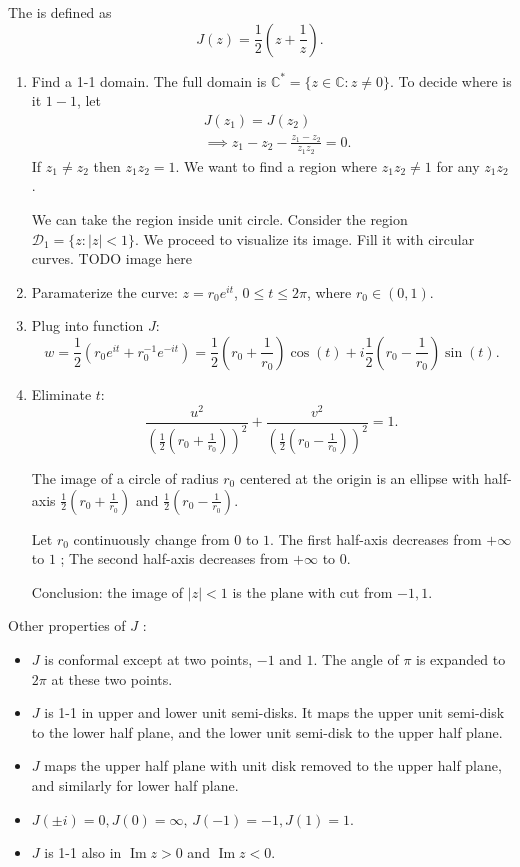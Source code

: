 \begin{example}
	The  is defined as
	\[
	J(z) = \frac{1}{2}(z + \frac{1}{z})
	.\]
	\begin{enumerate}
		\item Find a 1-1 domain. The full domain is $\mathbb{C}^* = \{z \in \mathbb{C}: z \neq  0\} $.
	To decide where is it $1-1$, let
	\begin{align*}
		& J(z_1) = J(z_2)\\
		&\implies z_1-z_2 - \frac{z_1-z_2}{z_1z_2} = 0 
	.\end{align*}
	If $z_1 \neq  z_2$ then $z_1z_2 = 1$. We want to find a region where $z_1z_2 \neq  1$ for any $z_1z_2$.

	We can take the region inside unit circle. Consider the region $\mathcal{D}_1 = \{z: |z|<1\} $.
	We proceed to visualize its image. Fill it with circular curves.
	TODO image here
	
\item Paramaterize the curve: $z = r_0 e^{it}$, $0\le t\le 2\pi$, where $r_0 \in (0,1)$. 
\item Plug into function $J$: \[
		w = \frac{1}{2}\left( r_0 e^{it }+r_0^{-1}e^{-it} \right) 
		= \frac{1}{2}\left( r_0 + \frac{1}{r_0} \right) \cos(t) + i \frac{1}{2} \left(r_0 - \frac{1}{r_0}\right) \sin(t).
	\]
\item Eliminate $t$:
	\[
	\frac{u^2}{\left(\frac{1}{2} \left( r_0 + \frac{1}{r_0} \right)  \right) ^2} 
	+ \frac{v^2}{\left(\frac{1}{2} \left( r_0 - \frac{1}{r_0} \right)  \right) ^2} = 1
	.\] 

	The image of a circle of radius $r_0$ centered at the origin is an ellipse with half-axis $\frac{1}{2} \left( r_0 + \frac{1}{r_0} \right)   $ and $\frac{1}{2} \left( r_0 - \frac{1}{r_0} \right)  $.

	Let $r_0$ continuously change from $0$ to $1$. The first half-axis decreases from $+\infty $ to $1$ ; The second half-axis decreases from $+\infty $ to $0$. 

	Conclusion: the image of $|z| < 1$ is the plane with cut from $-1, 1$.


	\end{enumerate}
Other properties of $J$ :
\begin{itemize}
\item $J$ is conformal except at two points, $-1$ and $1$. The angle of $\pi$ is expanded to $2 \pi$ at these two points.
\item $J$ is 1-1 in upper and lower unit semi-disks. It maps the upper unit semi-disk to the lower half plane, and the lower unit semi-disk to the upper half plane.
\item $J$ maps the upper half plane with unit disk removed to the upper half plane, and similarly for lower half plane.
\item $J(\pm i) = 0, J(0) = \infty$, $J(-1) = -1, J(1) = 1$.
\item $J$ is 1-1 also in $\operatorname{Im} z > 0$ and $\operatorname{Im}  z < 0$.
\end{itemize}
\end{example}

